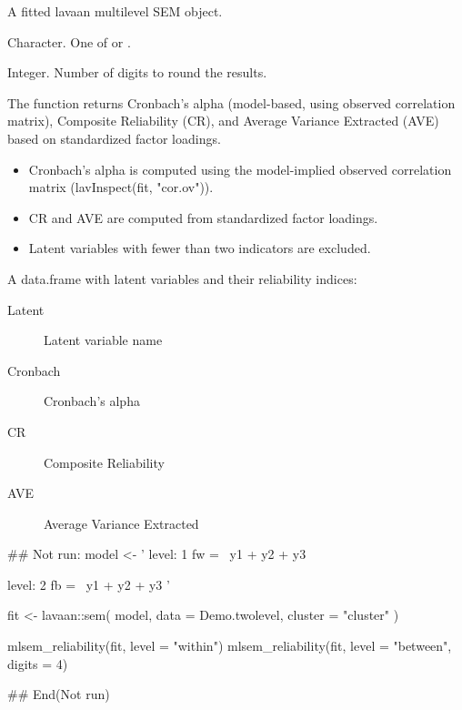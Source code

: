 \documentclass[a4paper]{book}
\begin{document}
%
\begin{Arguments}
\begin{ldescription}
\item[\code{fit}] A fitted lavaan multilevel SEM object.

\item[\code{level}] Character. One of  or .

\item[\code{digits}] Integer. Number of digits to round the results.
\end{ldescription}
\end{Arguments}
%
\begin{Details}
The function returns Cronbach's alpha (model-based, using observed
correlation matrix), Composite Reliability (CR), and Average Variance
Extracted (AVE) based on standardized factor loadings.


\begin{itemize}

\item{} Cronbach's alpha is computed using the model-implied observed
correlation matrix (lavInspect(fit, "cor.ov")).
\item{} CR and AVE are computed from standardized factor loadings.
\item{} Latent variables with fewer than two indicators are excluded.

\end{itemize}

\end{Details}
%
\begin{Value}
A data.frame with latent variables and their reliability indices:
\begin{description}

\item[Latent] Latent variable name
\item[Cronbach] Cronbach's alpha
\item[CR] Composite Reliability
\item[AVE] Average Variance Extracted

\end{description}

\end{Value}
%
\begin{Examples}
\begin{ExampleCode}
## Not run: 
model <- '
level: 1
  fw =~ y1 + y2 + y3

level: 2
  fb =~ y1 + y2 + y3
'

fit <- lavaan::sem(
  model,
  data    = Demo.twolevel,
  cluster = "cluster"
)

mlsem_reliability(fit, level = "within")
mlsem_reliability(fit, level = "between", digits = 4)

## End(Not run)
\end{ExampleCode}
\end{Examples}
\end{document}
